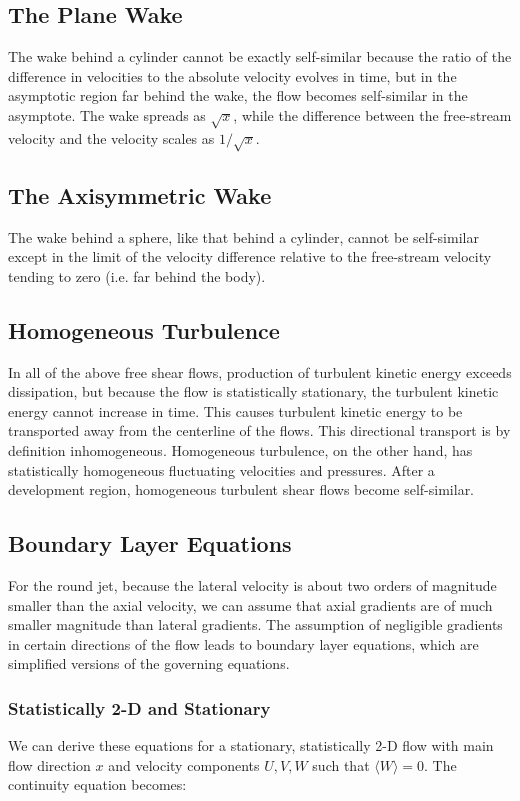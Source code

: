 \documentclass[10pt]{article}
\newcommand{\la}{\langle}
\newcommand{\ra}{\rangle}
\begin{document}
\begin{flushleft}
\subsection{The Plane Wake}

The wake behind a cylinder cannot be exactly self-similar because the ratio of the difference in velocities to the absolute velocity evolves in time, but in the asymptotic region far behind the wake, the flow becomes self-similar in the asymptote. The wake spreads as \(\sqrt{x}\), while the difference between the free-stream velocity and the velocity scales as \(1/\sqrt{x}\). 

\subsection{The Axisymmetric Wake} 
The wake behind a sphere, like that behind a cylinder, cannot be self-similar except in the limit of the velocity difference relative to the free-stream velocity tending to zero (i.e. far behind the body). 

\subsection{Homogeneous Turbulence}
In all of the above free shear flows, production of turbulent kinetic energy exceeds dissipation, but because the flow is statistically stationary, the turbulent kinetic energy cannot increase in time. This causes turbulent kinetic energy to be transported away from the centerline of the flows. This directional transport is by definition inhomogeneous. Homogeneous turbulence, on the other hand, has statistically homogeneous fluctuating velocities and pressures. After a development region, homogeneous turbulent shear flows become self-similar. 






\subsection{Boundary Layer Equations}
For the round jet, because the lateral velocity is about two orders of magnitude smaller than the axial velocity, we can assume that axial gradients are of much smaller magnitude than lateral gradients. The assumption of negligible gradients in certain directions of the flow leads to boundary layer equations, which are simplified versions of the governing equations. 


\subsubsection{Statistically 2-D and Stationary}
We can derive these equations for a stationary, statistically 2-D flow with main flow direction \(x\) and velocity components \(U, V, W\) such that \(\la W\ra=0\). The continuity equation becomes:


\end{flushleft}
\end{document}
